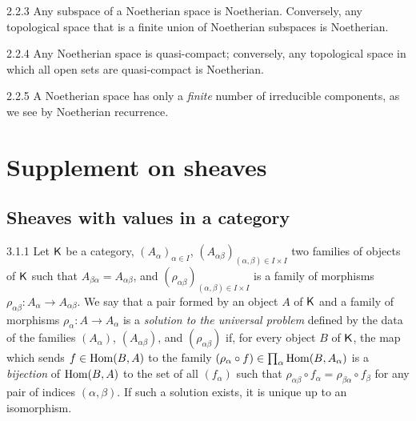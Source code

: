 \begin{env}{2.2.3}
\label{env-0.2.2.3}
Any subspace of a Noetherian space is Noetherian. Conversely, any topological space that is a
finite union of Noetherian subspaces is Noetherian.
\end{env}

\begin{env}{2.2.4}
\label{env-0.2.2.4}
Any Noetherian space is quasi-compact; conversely, any  topological space in which all open
sets are quasi-compact is Noetherian.
\end{env}

\begin{env}{2.2.5}
\label{env-0.2.2.5}
A Noetherian space has only a \emph{finite} number of irreducible components, as we see by
Noetherian recurrence.
\end{env}

\section{Supplement on sheaves}
\label{0-prelim-3}

\subsection{Sheaves with values in a category}
\label{0-prelim-3.1}

\begin{env}{3.1.1}
\label{env-0.3.1.1}
Let $\mathsf{K}$ be a category, $(A_\alpha)_{\alpha\in I}$,
$(A_{\alpha\beta})_{(\alpha,\beta)\in I\times I}$ two families of objects of $\mathsf{K}$ such
that $A_{\beta\alpha}=A_{\alpha\beta}$, and
$(\rho_{\alpha\beta})_{(\alpha,\beta)\in I\times I}$ is a family of morphisms
$\rho_{\alpha\beta}:A_\alpha\to A_{\alpha\beta}$. We say that a pair formed by an object $A$
of $\mathsf{K}$ and a family of morphisms $\rho_\alpha:A\to A_\alpha$ is a \emph{solution to the
universal problem} defined by the data of the families $(A_\alpha)$, $(A_{\alpha\beta})$,
and $(\rho_{\alpha\beta})$ if, for every object $B$ of $\mathsf{K}$, the map which sends
$f\in{\mathop{\mathrm{Hom}}\nolimits}(B,A)$ to the family
$(\rho_\alpha\circ f)\in\prod_\alpha{\mathop{\mathrm{Hom}}\nolimits}(B,A_\alpha)$ is a \emph{bijection} of ${\mathop{\mathrm{Hom}}\nolimits}(B,A)$ to
the set of all $(f_\alpha)$ such that
$\rho_{\alpha\beta}\circ f_\alpha=\rho_{\beta\alpha}\circ f_\beta$ for any pair of indices
$(\alpha,\beta)$. If such a solution exists, it is unique up to an isomorphism.
\end{env}

